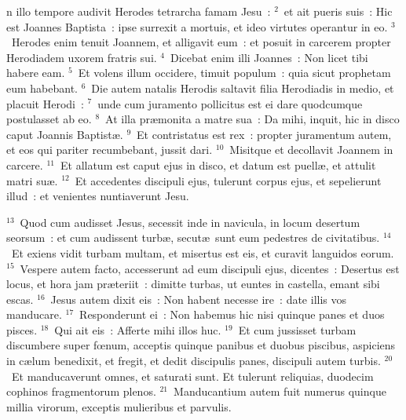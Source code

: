 \bchapter
{}n illo tempore audivit Herodes tetrarcha famam Jesu~:
${}^{2}$~et ait pueris suis~: Hic est Joannes Baptista~: ipse surrexit a mortuis, et ideo virtutes operantur in eo.
${}^{3}$~Herodes enim tenuit Joannem, et alligavit eum~: et posuit in carcerem propter Herodiadem uxorem fratris sui.
${}^{4}$~Dicebat enim illi Joannes~: Non licet tibi habere eam.
${}^{5}$~Et volens illum occidere, timuit populum~: quia sicut prophetam eum habebant.
${}^{6}$~Die autem natalis Herodis saltavit filia Herodiadis in medio, et placuit Herodi~:
${}^{7}$~unde cum juramento pollicitus est ei dare quodcumque postulasset ab eo.
${}^{8}$~At illa pr\ae monita a matre sua~: Da mihi, inquit, hic in disco caput Joannis Baptist\ae .
${}^{9}$~Et contristatus est rex~: propter juramentum autem, et eos qui pariter recumbebant, jussit dari.
${}^{10}$~Misitque et decollavit Joannem in carcere.
${}^{11}$~Et allatum est caput ejus in disco, et datum est puell\ae , et attulit matri su\ae .
${}^{12}$~Et accedentes discipuli ejus, tulerunt corpus ejus, et sepelierunt illud~: et venientes nuntiaverunt Jesu.


${}^{13}$~Quod cum audisset Jesus, secessit inde in navicula, in locum desertum seorsum~: et cum audissent turb\ae , secut\ae\ sunt eum pedestres de civitatibus.
${}^{14}$~Et exiens vidit turbam multam, et misertus est eis, et curavit languidos eorum.
${}^{15}$~Vespere autem facto, accesserunt ad eum discipuli ejus, dicentes~: Desertus est locus, et hora jam pr\ae teriit~: dimitte turbas, ut euntes in castella, emant sibi escas.
${}^{16}$~Jesus autem dixit eis~: Non habent necesse ire~: date illis vos manducare.
${}^{17}$~Responderunt ei~: Non habemus hic nisi quinque panes et duos pisces.
${}^{18}$~Qui ait eis~: Afferte mihi illos huc.
${}^{19}$~Et cum jussisset turbam discumbere super fœnum, acceptis quinque panibus et duobus piscibus, aspiciens in c\ae lum benedixit, et fregit, et dedit discipulis panes, discipuli autem turbis.
${}^{20}$~Et manducaverunt omnes, et saturati sunt. Et tulerunt reliquias, duodecim cophinos fragmentorum plenos.
${}^{21}$~Manducantium autem fuit numerus quinque millia virorum, exceptis mulieribus et parvulis.


